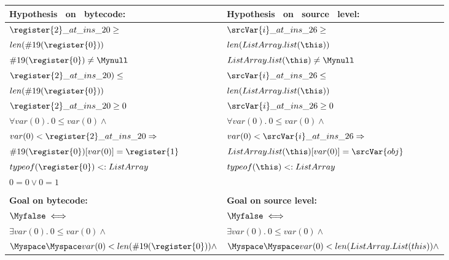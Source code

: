 \begin{figure*}[!h]

\begin{center}
\begin{tabular}{|l|l|}
\hline
\bf{Hypothesis \ on \ bytecode:}  & \bf{Hypothesis \ on \ source \ level:}  \\
\hline 
$\register{2}\_at\_ins\_20 \geq $ 
& $ \srcVar{i}\_at\_ins\_26 \geq$ \\

$len(\#19(\register{0})) $ & $  len(ListArray.list(\this)) $ \\
\hline 

$\#19(\register{0}) \neq \Mynull$ 
& $ ListArray.list(\this) \neq \Mynull$ \\

\hline 
$ \register{2}\_at\_ins\_20) \leq$ 
&  $  \srcVar{i}\_at\_ins\_26  \leq   $ \\
$ len(\#19(\register{0}))  $ & $ len(ListArray.list(\this))  $ \\
\hline

$\register{2}\_at\_ins\_20 \geq 0  $ 
& $ \srcVar{i}\_at\_ins\_26  \geq 0 $ \\

\hline

$\forall  var(0). \  0 \leq var(0) \wedge  $ & $\forall  var(0). \  0 \leq var(0) \wedge $ \\
$ var(0) < \register{2}\_at\_ins\_20 \Rightarrow $ & $  var(0) < \srcVar{i}\_at\_ins\_26 \Rightarrow $\\
$ \#19(\register{0})[var(0)] = \register{1}   $ & $  ListArray.list(\this)[var(0)] = \srcVar{obj}  $ \\

\hline

 $typeof(\register{0}) <: ListArray$ & $typeof( \this) <:  ListArray$  \\
\hline

$0=0 \vee 0=1$ & \\

& \\

\hline
\bf{Goal on bytecode:} & \bf{Goal on source level:} \\
\hline
$\Myfalse  \iff $ & $\Myfalse \iff  $ \\
 $ \exists  var(0) . \ 0 \leq var(0) \wedge$ 
& $ \exists  var(0) . \ 0 \leq var(0) \wedge$ \\

$\Myspace \Myspace var(0) < len(\#19(\register{0})) \wedge$ 
& $\Myspace \Myspace  var(0) < len(ListArray.List(this)) \wedge $\\
       

\end{tabular}
\end{center}
\end{figure*}
